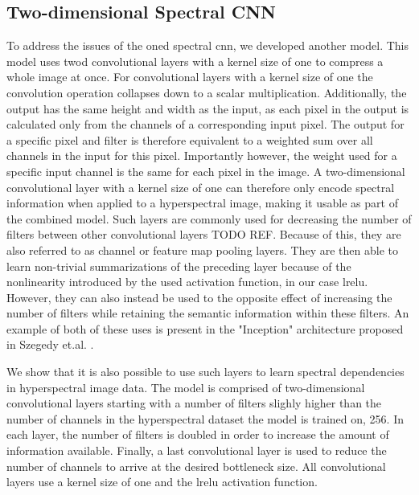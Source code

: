 \subsection{Two-dimensional Spectral CNN\label{sec:fastconv1d}}
To address the issues of the \ac{oned} spectral \ac{cnn}, we developed another model. This model uses \ac{twod} convolutional layers with a kernel size of one to compress a whole image at once. For convolutional layers with a kernel size of one the convolution operation collapses down to a scalar multiplication. Additionally, the output has the same height and width as the input, as each pixel in the output is calculated only from the channels of a corresponding input pixel. The output for a specific pixel and filter is therefore equivalent to a weighted sum over all channels in the input for this pixel. Importantly however, the weight used for a specific input channel is the same for each pixel in the image. A two-dimensional convolutional layer with a kernel size of one can therefore only encode spectral information when applied to a hyperspectral image, making it usable as part of the combined model. Such layers are commonly used for decreasing the number of filters between other convolutional layers TODO REF. Because of this, they are also referred to as channel or feature map pooling layers. They are then able to learn non-trivial summarizations of the preceding layer because of the nonlinearity introduced by the used activation function, in our case \ac{lrelu}. However, they can also instead be used to the opposite effect of increasing the number of filters while retaining the semantic information within these filters. An example of both of these uses is present in the "Inception" architecture proposed in Szegedy et.al. \citep{szegedy_going_2014}.

We show that it is also possible to use such layers to learn spectral dependencies in hyperspectral image data. The model is comprised of two-dimensional convolutional layers starting with a number of filters slighly higher than the number of channels in the hyperspectral dataset the model is trained on, 256. In each layer, the number of filters is doubled in order to increase the amount of information available. Finally, a last convolutional layer is used to reduce the number of channels to arrive at the desired bottleneck size. All convolutional layers use a kernel size of one and the \ac{lrelu} activation function.

